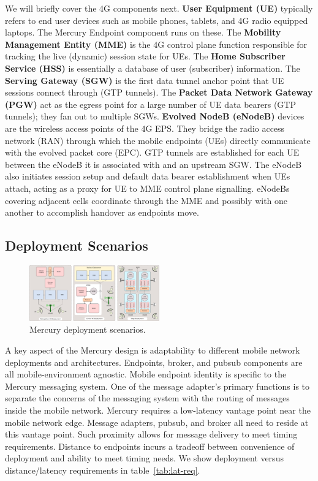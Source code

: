 We will briefly cover the 4G components next. \textbf{User Equipment
  (UE)} typically refers to end user devices such as mobile phones,
tablets, and 4G radio equipped laptops. The Mercury Endpoint component
runs on these. The \textbf{Mobility Management Entity (MME)} is the 4G
control plane function responsible for tracking the live (dynamic)
session state for UEs. The \textbf{Home Subscriber Service (HSS)} is
essentially a database of user (subscriber) information. The
\textbf{Serving Gateway (SGW)} is the first data tunnel anchor point
that UE sessions connect through (GTP tunnels). The \textbf{Packet
  Data Network Gateway (PGW)} act as the egress point for a large
number of UE data bearers (GTP tunnels); they fan out to multiple
SGWs.  \textbf{Evolved NodeB (eNodeB)} devices are the wireless access
points of the 4G EPS. They bridge the radio access network (RAN)
through which the mobile endpoints (UEs) directly communicate with the
evolved packet core (EPC). GTP tunnels are established for each UE
between the eNodeB it is associated with and an upstream SGW.  The
eNodeB also initiates session setup and default data bearer
establishment when UEs attach, acting as a proxy for UE to MME
control plane signalling. eNodeBs covering adjacent cells coordinate
through the MME and possibly with one another to accomplish handover
as endpoints move.

\subsection{Deployment Scenarios}

\begin{figure}[ht]
  \begin{center}
    \includegraphics[width=0.5\textwidth]{figs/deploy.png}
    \caption{Mercury deployment scenarios.}
    \label{fig:deployments}
  \end{center}
\end{figure}

A key aspect of the Mercury design is adaptability to different mobile
network deployments and architectures. Endpoints, broker, and pubsub
components are all mobile-environment agnostic. Mobile endpoint
identity is specific to the Mercury messaging system. One of the message
adapter's primary functions is to separate the concerns of the
messaging system with the routing of messages inside the mobile
network.  Mercury requires a low-latency vantage point near the mobile
network edge. Message adapters, pubsub, and broker all need to reside
at this vantage point.  Such proximity allows for message delivery to
meet timing requirements.  Distance to endpoints incurs a tradeoff between
convenience of deployment and ability to meet timing needs. We show
deployment versus distance/latency requirements in
table~\ref{tab:lat-req}.

